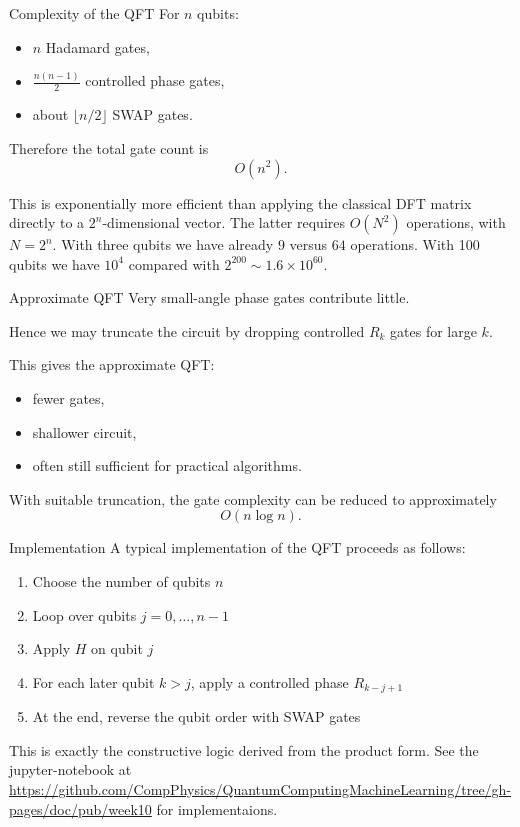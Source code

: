 \documentclass{beamer}
\begin{document}
\begin{frame}{Complexity of the QFT}
For \(n\) qubits:
\begin{itemize}
\item \(n\) Hadamard gates,
\item \(\frac{n(n-1)}{2}\) controlled phase gates,
\item about \(\lfloor n/2 \rfloor\) SWAP gates.
\end{itemize}

Therefore the total gate count is
\[
O(n^2).
\]

This is exponentially more efficient than applying the classical DFT matrix directly to a \(2^n\)-dimensional vector. The latter requires $O(N^2)$ operations, with $N=2^n$. With three qubits we have already $9$ versus $64$ operations. With 100 qubits we have $10^4$ compared with $2^{200}\sim 1.6\times 10^{60}$.  
\end{frame}

\begin{frame}{Approximate QFT}
Very small-angle phase gates contribute little.

Hence we may truncate the circuit by dropping controlled \(R_k\) gates for large \(k\).

This gives the approximate QFT:
\begin{itemize}
\item fewer gates,
\item shallower circuit,
\item often still sufficient for practical algorithms.
\end{itemize}

With suitable truncation, the gate complexity can be reduced to approximately
\[
O(n \log n).
\]
\end{frame}


\begin{frame}{Implementation}
A typical implementation of the QFT proceeds as follows:

\begin{enumerate}
\item Choose the number of qubits \(n\)
\item Loop over qubits \(j=0,\dots,n-1\)
\item Apply \(H\) on qubit \(j\)
\item For each later qubit \(k>j\), apply a controlled phase \(R_{k-j+1}\)
\item At the end, reverse the qubit order with SWAP gates
\end{enumerate}

This is exactly the constructive logic derived from the product form.
See the jupyter-notebook at \url{https://github.com/CompPhysics/QuantumComputingMachineLearning/tree/gh-pages/doc/pub/week10} for implementaions.
\end{frame}
\end{document}
